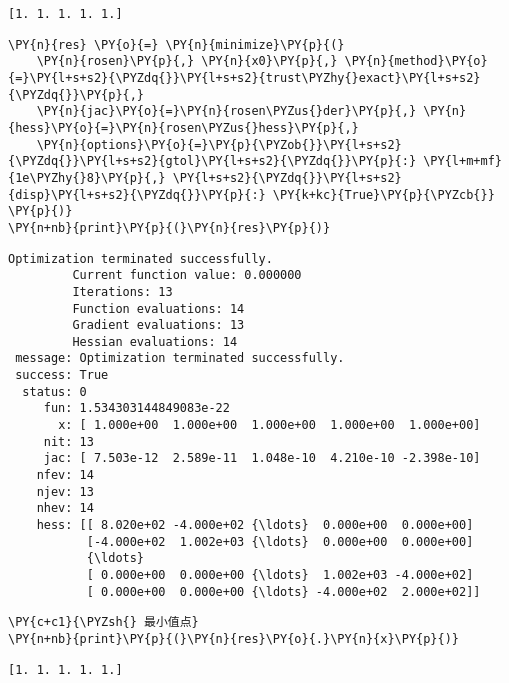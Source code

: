     \begin{Verbatim}[commandchars=\\\{\}]
[1. 1. 1. 1. 1.]
    \end{Verbatim}

    \begin{tcolorbox}[breakable, size=fbox, boxrule=1pt, pad at break*=1mm,colback=cellbackground, colframe=cellborder]
\begin{Verbatim}[commandchars=\\\{\}]
\PY{n}{res} \PY{o}{=} \PY{n}{minimize}\PY{p}{(}
    \PY{n}{rosen}\PY{p}{,} \PY{n}{x0}\PY{p}{,} \PY{n}{method}\PY{o}{=}\PY{l+s+s2}{\PYZdq{}}\PY{l+s+s2}{trust\PYZhy{}exact}\PY{l+s+s2}{\PYZdq{}}\PY{p}{,}
    \PY{n}{jac}\PY{o}{=}\PY{n}{rosen\PYZus{}der}\PY{p}{,} \PY{n}{hess}\PY{o}{=}\PY{n}{rosen\PYZus{}hess}\PY{p}{,}
    \PY{n}{options}\PY{o}{=}\PY{p}{\PYZob{}}\PY{l+s+s2}{\PYZdq{}}\PY{l+s+s2}{gtol}\PY{l+s+s2}{\PYZdq{}}\PY{p}{:} \PY{l+m+mf}{1e\PYZhy{}8}\PY{p}{,} \PY{l+s+s2}{\PYZdq{}}\PY{l+s+s2}{disp}\PY{l+s+s2}{\PYZdq{}}\PY{p}{:} \PY{k+kc}{True}\PY{p}{\PYZcb{}}
\PY{p}{)}
\PY{n+nb}{print}\PY{p}{(}\PY{n}{res}\PY{p}{)}
\end{Verbatim}
\end{tcolorbox}

    \begin{Verbatim}[commandchars=\\\{\}]
Optimization terminated successfully.
         Current function value: 0.000000
         Iterations: 13
         Function evaluations: 14
         Gradient evaluations: 13
         Hessian evaluations: 14
 message: Optimization terminated successfully.
 success: True
  status: 0
     fun: 1.534303144849083e-22
       x: [ 1.000e+00  1.000e+00  1.000e+00  1.000e+00  1.000e+00]
     nit: 13
     jac: [ 7.503e-12  2.589e-11  1.048e-10  4.210e-10 -2.398e-10]
    nfev: 14
    njev: 13
    nhev: 14
    hess: [[ 8.020e+02 -4.000e+02 {\ldots}  0.000e+00  0.000e+00]
           [-4.000e+02  1.002e+03 {\ldots}  0.000e+00  0.000e+00]
           {\ldots}
           [ 0.000e+00  0.000e+00 {\ldots}  1.002e+03 -4.000e+02]
           [ 0.000e+00  0.000e+00 {\ldots} -4.000e+02  2.000e+02]]
    \end{Verbatim}

    \begin{tcolorbox}[breakable, size=fbox, boxrule=1pt, pad at break*=1mm,colback=cellbackground, colframe=cellborder]
\begin{Verbatim}[commandchars=\\\{\}]
\PY{c+c1}{\PYZsh{} 最小值点}
\PY{n+nb}{print}\PY{p}{(}\PY{n}{res}\PY{o}{.}\PY{n}{x}\PY{p}{)}
\end{Verbatim}
\end{tcolorbox}

    \begin{Verbatim}[commandchars=\\\{\}]
[1. 1. 1. 1. 1.]
    \end{Verbatim}
